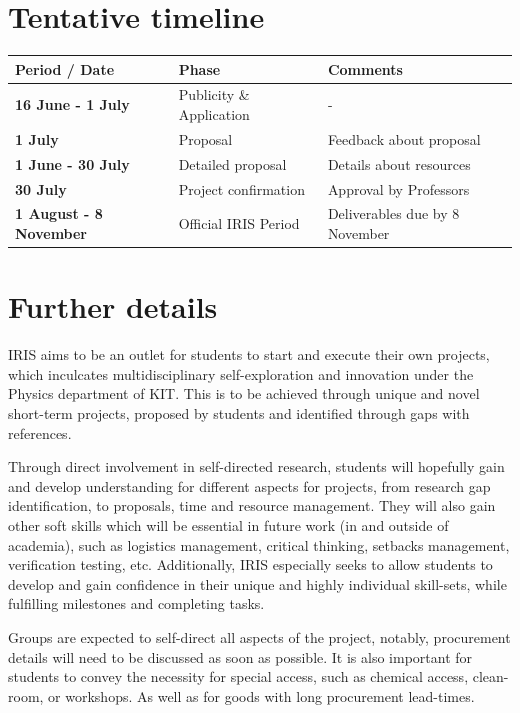 \documentclass{report}
\begin{document}
	\section{Tentative timeline}
	\begin{tabularx}{\textwidth} { 
			| >{\centering\arraybackslash\bf}X 
			| >{\raggedright\arraybackslash}X 
			| >{\raggedright\arraybackslash}X | }
		\hline
		Period / Date & \bf{Phase} & \bf{Comments} \\
		\hline
		  16 June - 1 July  & Publicity \& Application & -  \\
		\hline
		  1 July  & Proposal & Feedback about proposal  \\
		\hline
		1 June - 30 July  & Detailed proposal  & Details about resources  \\
		\hline
		30 July  & Project confirmation  & Approval by Professors  \\
		\hline
		1 August - 8 November  & Official IRIS Period  & Deliverables due by 8 November\\
		\hline
		
	\end{tabularx}

        \section{Further details}
        IRIS aims to be an outlet for students to start and execute their own projects, which inculcates multidisciplinary self-exploration and innovation under the Physics department of KIT. This is to be achieved through unique and novel short-term projects, proposed by students and identified through gaps with references.
        \newline

        \noindent
        Through direct involvement in self-directed research, students will hopefully gain and develop understanding for different aspects for projects, from research gap identification, to proposals, time and resource management.  They will also gain other soft skills which will be essential in future work (in and outside of academia), such as logistics management, critical thinking, setbacks management, verification testing, etc. Additionally, IRIS especially seeks to allow students to develop and gain confidence in their unique and highly individual skill-sets, while fulfilling milestones and completing tasks.
        \newline

        \noindent
        Groups are expected to self-direct all aspects of the project, notably, procurement details will need to be discussed as soon as possible. It is also important for students to convey the necessity for special access, such as chemical access, clean-room, or workshops. As well as for goods with long procurement lead-times.
\end{document}
